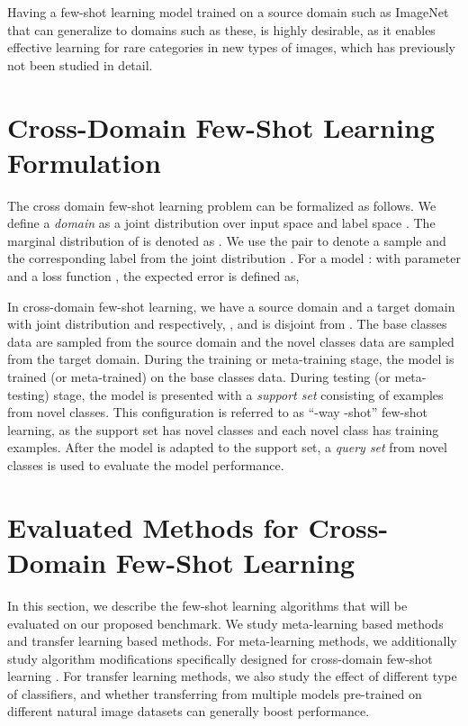 \documentclass[runningheads]{llncs}
\begin{document}
Having a few-shot learning model trained on a source domain such as ImageNet \cite{deng2009imagenet} that can generalize to domains such as these, is highly desirable, as it enables effective learning for rare categories in new types of images, which has previously not been studied in detail. 

\section{Cross-Domain Few-Shot Learning Formulation}

The cross domain few-shot learning problem can be formalized as follows. We define a \textit{domain} as a joint distribution  over input space  and label space . The marginal distribution of  is denoted as . We use the pair  to denote a sample  and the corresponding label  from the joint distribution . For a model  :    with parameter  and a loss function , the expected error is defined as,


In cross-domain few-shot learning, we have a source domain  and a target domain  with joint distribution  and  respectively,  , and   is disjoint from . The base classes data are sampled from the source domain and the novel classes data are sampled from the target domain. During the training or meta-training stage, the model  is trained (or meta-trained) on the base classes data. During testing (or meta-testing) stage, the model is presented with a \textit{support set}  consisting of  examples from  novel classes. This configuration is referred to as ``-way -shot'' few-shot learning, as the support set has  novel classes and each novel class has  training examples. After the model is adapted to the support set, a \textit{query set} from novel classes is used to evaluate the model performance.


\section{Evaluated Methods for Cross-Domain Few-Shot Learning}
\label{sec:methods}
In this section, we describe the few-shot learning algorithms that will be evaluated on our proposed benchmark. We study meta-learning based methods and transfer learning based methods. For meta-learning methods, we additionally study algorithm modifications specifically designed for cross-domain few-shot learning \cite{tsengcrossdomain}. For transfer learning methods, we also study the effect of different type of classifiers, and whether transferring from multiple models pre-trained on different natural image datasets can generally boost performance. 
\end{document}
